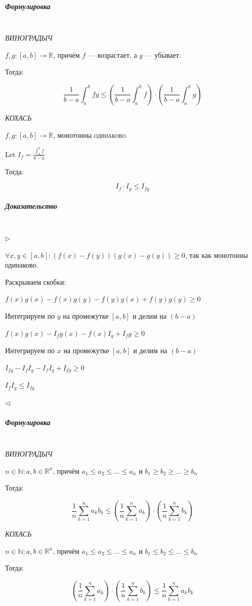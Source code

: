 \documentclass{article}
\let\vanillasubparagraph\subparagraph
\renewcommand{\subparagraph}[1]{\vanillasubparagraph{#1}\mbox{}\\}
\begin{document}
\subparagraph{Формулировка}

\textit{ВИНОГРАДЫЧ}

$f, g : \left[a, b\right] \rightarrow \mathbb{R}$, причём $f$ --- возрастает, а $g$ --- убывает.

Тогда:

\[\frac{1}{b - a}\int_a^b{fg} \le \left(\frac{1}{b - a} \int_a^bf\right) \cdot \left(\frac{1}{b - a} \int_a^bg\right)\]


\textit{КОХАСЬ}

$f, g : \left[a, b\right] \rightarrow \mathbb{R}$, монотонны \textsc{одинаково}

Let $I_f = \frac{\int_a^b{f}}{b - a}$

Тогда:

\[ I_f \cdot I_g \le I_{fg}\]


\subparagraph{Доказательство}
$\rhd$

$\forall x, y \in [a, b] : \left(f(x) - f(y)\right)\left(g(x) - g(y)\right) \ge 0$, так как монотонны одинаково. 

Раскрываем скобки:

$f(x)g(x) - f(x)g(y) - f(y)g(x) + f(y)g(y) \ge 0$

Интегрируем по $y$ на промежутке $[a, b]$ и делим на $(b - a)$ 

$f(x)g(x) - I_fg(x) - f(x)I_g + I_fg \ge 0$

Интегрируем по $x$ на промежутке $[a, b]$ и делим на $(b - a)$

$I_{fg} - I_fI_g - I_fI_g + I_{fg} \ge 0$

$I_fI_g \le I_{fg}$

$\lhd$


\subparagraph{Формулировка}

\textit{ВИНОГРАДЫЧ}

$n \in \mathbb{N}; a, b \in \mathbb{R}^n$, причём $a_1 \le a_2 \le \ldots \le a_n$ и $b_1 \ge b_2 \ge \ldots \ge b_n$

Тогда:

\[\frac{1}{n}\sum_{k = 1}^n{a_kb_k} \le \left(\frac{1}{n}\sum_{k = 1}^n{a_k}\right) \cdot \left(\frac{1}{n}\sum_{k = 1}^n{b_k}\right)\]

\textit{КОХАСЬ}

$n \in \mathbb{N}; a, b \in \mathbb{R}^n$, причём $a_1 \le a_2 \le \ldots \le a_n$ и $b_1 \le b_2 \le \ldots \le b_n$

Тогда:

\[\left(\frac{1}{n}\sum_{k = 1}^n{a_k}\right) \cdot \left(\frac{1}{n}\sum_{k = 1}^n{b_k}\right) \le \frac{1}{n}\sum_{k = 1}^n{a_kb_k} \]
\end{document}
